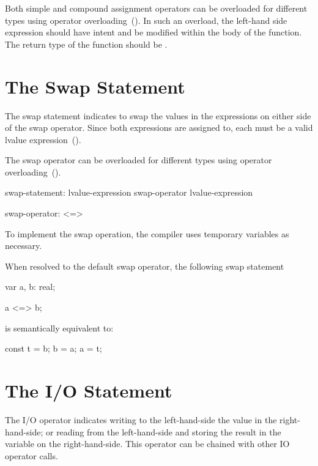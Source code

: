 Both simple and compound assignment operators can be overloaded for different
types using operator overloading~().
In such an overload, the left-hand side expression should have
 intent and be modified within the body of the function.  The return
type of the function should be .

\section{The Swap Statement}
\label{The_Swap_Statement}

The swap statement indicates to swap the values in the expressions
on either side of the swap operator.  Since both expressions are assigned
to, each must be a valid lvalue expression~().

The swap operator can be overloaded for different types using operator
overloading~().
\begin{syntax}
swap-statement:
  lvalue-expression swap-operator lvalue-expression

swap-operator:
  <=>
\end{syntax}

To implement the swap operation, the compiler uses temporary variables
as necessary.

\begin{example}
When resolved to the default swap operator, the following swap statement
\begin{chapel}
var a, b: real;

a <=> b;
\end{chapel}
is semantically equivalent to:
\begin{chapel}
const t = b;
b = a;
a = t;
\end{chapel}
\end{example}

\section{The I/O Statement}
\label{The_IO_Statement}

The I/O operator indicates writing to the left-hand-side the value in the
right-hand-side; or reading from the left-hand-side and storing the result
in the variable on the right-hand-side. This operator can be chained with
other IO operator calls.


